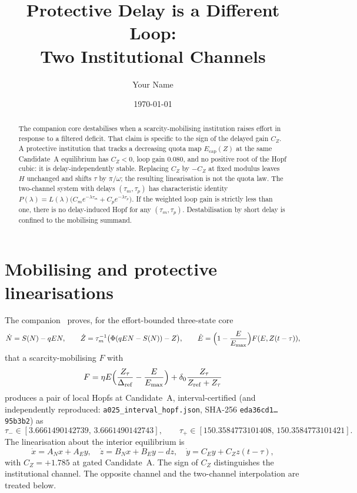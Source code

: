 \documentclass[11pt]{article}
\title{Protective Delay is a Different Loop:\\ Two Institutional Channels}
\author{Your Name}
\date{\today}
\theoremstyle{definition}
\begin{document}
\maketitle

\begin{abstract}
The companion core destabilises when a scarcity-mobilising institution raises effort in response to a filtered deficit. That claim is specific to the sign of the delayed gain $C_Z$. A protective institution that tracks a decreasing quota map $E_{\mathrm{cap}}(Z)$ at the same Candidate~A equilibrium has $C_Z<0$, loop gain $0.080$, and no positive root of the Hopf cubic: it is delay-independently stable. Replacing $C_Z$ by $-C_Z$ at fixed modulus leaves $H$ unchanged and shifts $\tau$ by $\pi/\omega$; the resulting linearisation is not the quota law. The two-channel system with delays $(\tau_m,\tau_p)$ has characteristic identity $P(\lambda)=L(\lambda)\bigl(C_m e^{-\lambda\tau_m}+C_p e^{-\lambda\tau_p}\bigr)$. If the weighted loop gain is strictly less than one, there is no delay-induced Hopf for any $(\tau_m,\tau_p)$. Destabilisation by short delay is confined to the mobilising summand.
\end{abstract}

\section{Mobilising and protective linearisations}
\label{sec:claim}

The companion~\cite{paperI} proves, for the effort-bounded three-state core
\begin{equation}
\dot N=S(N)-qEN,\qquad
\dot Z=\tau_m^{-1}\bigl(\Phi(qEN-S(N))-Z\bigr),\qquad
\dot E=\Bigl(1-\frac{E}{E_{\max}}\Bigr)F(E,Z(t-\tau)),
\label{eq:core}
\end{equation}
that a scarcity-mobilising $F$ with
\[
F=\eta E\Bigl(\frac{Z_\tau}{\Delta_{\mathrm{ref}}}-\frac{E}{E_{\max}}\Bigr)+\delta_0\frac{Z_\tau}{Z_{\mathrm{ref}}+Z_\tau}
\]
produces a pair of local Hopfs at Candidate~A, interval-certified (and independently reproduced: \texttt{a025\_interval\_hopf.json}, SHA-256 \texttt{eda36cd1\ldots95b3b2}) as
\[
\tau_-\in[3.6661490142739,\,3.6661490142743],\qquad
\tau_+\in[150.3584773101408,\,150.3584773101421].
\]
The linearisation about the interior equilibrium is
\[
\dot x=A_N x+A_E y,\quad
\dot z=B_N x+B_E y-d z,\quad
\dot y=C_E y+C_Z z(t-\tau),
\]
with $C_Z=+1.785$ at gated Candidate~A. The sign of $C_Z$ distinguishes the institutional channel. The opposite channel and the two-channel interpolation are treated below.
\end{document}
